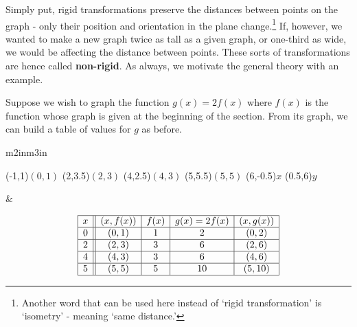 \documentclass{ximera}
\begin{document}
\smallskip

Simply put, rigid transformations preserve the distances between points on the graph -  only their position and orientation in the plane change.\footnote{Another word that can be used here instead of `rigid transformation' is `isometry' - meaning `same distance.'}  If, however, we wanted to make a new graph twice as tall as a given graph, or one-third as wide, we would be affecting the distance between points. These sorts of transformations are hence called \textbf{non-rigid}.  As always, we motivate the general theory with an example.

\smallskip

Suppose we wish to graph the function $g(x) =2 f(x)$ where $f(x)$ is the function whose graph is given at the beginning of the section. From its graph, we can build a table of values for $g$ as before.

\begin{center}

\begin{tabular}{m{2in}m{3in}}

\begin{mfpic}[15]{-1}{6}{-1}{6}
\tlabel[cc](-1,1){\scriptsize $(0,1)$}
\tlabel[cc](2,3.5){\scriptsize $(2,3)$}
\tlabel[cc](4,2.5){\scriptsize $(4,3)$}
\tlabel[cc](5,5.5){\scriptsize $(5,5)$}
\tlabel[cc](6,-0.5){\scriptsize $x$}
\tlabel[cc](0.5,6){\scriptsize $y$}
\axes
{}
\tlpointsep{4pt}
\penwd{1.25pt}
\end{mfpic}
 
&

\[ \begin{array}{|c||c|c|c|c|}  

\hline

 x & (x,f(x)) & f(x) & g(x)=2f(x) & (x, g(x)) \\ \hline
0  & (0,1)& 1 & 2 &(0, 2) \\  \hline
2 & (2,3) & 3 &  6 &(2,6) \\  \hline
4 & (4,3) & 3 &  6 &(4, 6) \\  \hline
5 & (5,5) & 5 &  10 &( 5 ,10) \\  \hline

\end{array} \] 

\end{tabular}

\end{center}
\end{document}
